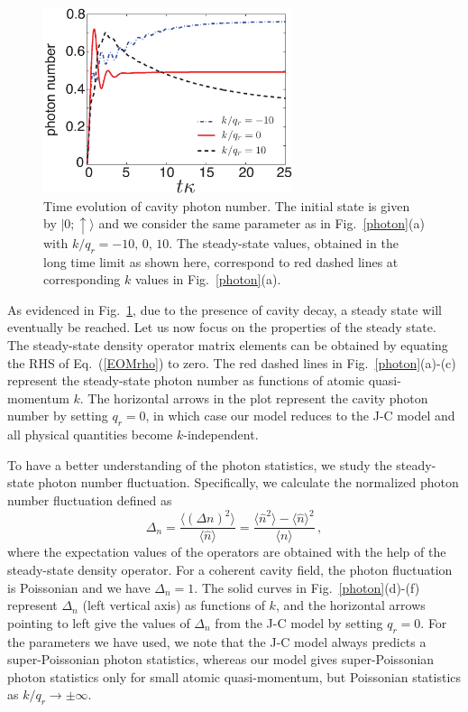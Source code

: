 \documentclass[atoms,article,submit,moreauthors,pdftex,12pt,a4paper]{mdpi}
\begin{document}
\begin{figure}[htp]
\includegraphics[width=0.65\textwidth]{photon_evolution}\caption{Time evolution of cavity photon number. The initial state is given by $|0;\uparrow\rangle$ and we consider the same parameter as in Fig.~\ref{photon}(a) with $k/q_r=-10,\,0,\,10$. The steady-state values, obtained in the long time limit as shown here, correspond to red dashed lines at corresponding $k$ values in Fig.~\ref{photon}(a).}\label{evo}
\end{figure}

As evidenced in Fig.~\ref{evo}, due to the presence of cavity decay, a steady state will eventually be reached. Let us now focus on the properties of the steady state. The steady-state density operator matrix elements can be obtained by equating the RHS of Eq.~(\ref{EOMrho}) to zero. The red dashed lines in Fig.~\ref{photon}(a)-(c) represent the steady-state photon number as functions of atomic quasi-momentum $k$. The horizontal arrows in the plot represent the cavity photon number by setting $q_r=0$, in which case our model reduces to the J-C model and all physical quantities become $k$-independent. 

To have a better understanding of the photon statistics, we study the steady-state photon number fluctuation. Specifically, we calculate the normalized photon number fluctuation defined as 
\[\Delta_n = \frac{\langle(\Delta n)^{2}\rangle}{\langle \hat{n}\rangle}=\frac{\langle \hat{n}^{2}\rangle-\langle \hat{n}\rangle^{2}}{\langle n\rangle} \,,\] 
where the expectation values of the operators are obtained with the help of the steady-state density operator. For a coherent cavity field, the photon fluctuation is Poissonian and we have $\Delta_n=1$.
The solid curves in Fig.~\ref{photon}(d)-(f) represent $\Delta_n$ (left vertical axis) as functions of $k$, and the horizontal arrows pointing to left give the values of $\Delta_n$ from the J-C model by setting $q_r=0$. For the parameters we have used, we note that the J-C model always predicts a super-Poissonian photon statistics, whereas our model gives super-Poissonian photon statistics only for small atomic quasi-momentum, but Poissonian statistics as $k/q_r \rightarrow \pm \infty$. 
\end{document}
